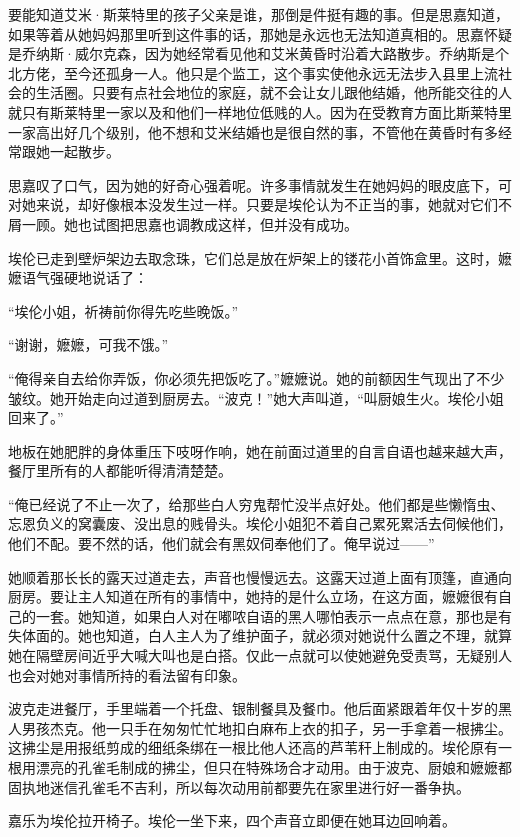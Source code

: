 \par 要能知道艾米·斯莱特里的孩子父亲是谁，那倒是件挺有趣的事。但是思嘉知道，如果等着从她妈妈那里听到这件事的话，那她是永远也无法知道真相的。思嘉怀疑是乔纳斯·威尔克森，因为她经常看见他和艾米黄昏时沿着大路散步。乔纳斯是个北方佬，至今还孤身一人。他只是个监工，这个事实使他永远无法步入县里上流社会的生活圈。只要有点社会地位的家庭，就不会让女儿跟他结婚，他所能交往的人就只有斯莱特里一家以及和他们一样地位低贱的人。因为在受教育方面比斯莱特里一家高出好几个级别，他不想和艾米结婚也是很自然的事，不管他在黄昏时有多经常跟她一起散步。
\par 思嘉叹了口气，因为她的好奇心强着呢。许多事情就发生在她妈妈的眼皮底下，可对她来说，却好像根本没发生过一样。只要是埃伦认为不正当的事，她就对它们不屑一顾。她也试图把思嘉也调教成这样，但并没有成功。
\par 埃伦已走到壁炉架边去取念珠，它们总是放在炉架上的镂花小首饰盒里。这时，嬷嬷语气强硬地说话了：
\par “埃伦小姐，祈祷前你得先吃些晚饭。”
\par “谢谢，嬷嬷，可我不饿。”
\par “俺得亲自去给你弄饭，你必须先把饭吃了。”嬷嬷说。她的前额因生气现出了不少皱纹。她开始走向过道到厨房去。“波克！”她大声叫道，“叫厨娘生火。埃伦小姐回来了。”
\par 地板在她肥胖的身体重压下吱呀作响，她在前面过道里的自言自语也越来越大声，餐厅里所有的人都能听得清清楚楚。
\par “俺已经说了不止一次了，给那些白人穷鬼帮忙没半点好处。他们都是些懒惰虫、忘恩负义的窝囊废、没出息的贱骨头。埃伦小姐犯不着自己累死累活去伺候他们，他们不配。要不然的话，他们就会有黑奴伺奉他们了。俺早说过——”
\par 她顺着那长长的露天过道走去，声音也慢慢远去。这露天过道上面有顶篷，直通向厨房。要让主人知道在所有的事情中，她持的是什么立场，在这方面，嬷嬷很有自己的一套。她知道，如果白人对在嘟哝自语的黑人哪怕表示一点点在意，那也是有失体面的。她也知道，白人主人为了维护面子，就必须对她说什么置之不理，就算她在隔壁房间近乎大喊大叫也是白搭。仅此一点就可以使她避免受责骂，无疑别人也会对她对事情所持的看法留有印象。
\par 波克走进餐厅，手里端着一个托盘、银制餐具及餐巾。他后面紧跟着年仅十岁的黑人男孩杰克。他一只手在匆匆忙忙地扣白麻布上衣的扣子，另一手拿着一根拂尘。这拂尘是用报纸剪成的细纸条绑在一根比他人还高的芦苇秆上制成的。埃伦原有一根用漂亮的孔雀毛制成的拂尘，但只在特殊场合才动用。由于波克、厨娘和嬷嬷都固执地迷信孔雀毛不吉利，所以每次动用前都要先在家里进行好一番争执。
\par 嘉乐为埃伦拉开椅子。埃伦一坐下来，四个声音立即便在她耳边回响着。
